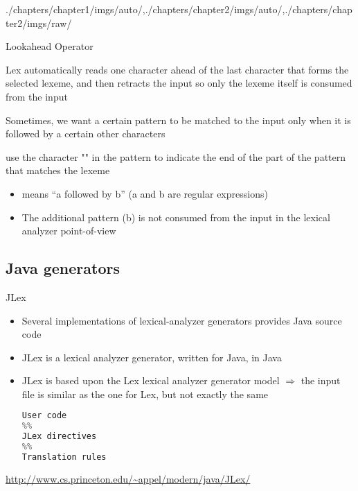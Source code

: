 \begin{graphicspathcontext}{{./chapters/chapter1/imgs/auto/},{./chapters/chapter2/imgs/auto/},{./chapters/chapter2/imgs/raw/}}
\begin{bibunit}[apalike]
\begin{frame}[background=8]{Lookahead Operator}
	\begin{description}
	\item Lex automatically reads one character ahead of the last character that forms the selected lexeme, and then retracts the input so only the lexeme itself is consumed from the input
	\vfill
	\item[Problem] Sometimes, we want a certain pattern to be matched to the input only when it is followed by a certain other characters
	\vfill
	\item[Solution] use the character "\code{/}" in the pattern to indicate the end of the part of the pattern that matches the lexeme
		\begin{itemize}
		\item {} means ``a followed by b'' (a and b are regular expressions) 
		\item The additional pattern (b) is not consumed from the input in the lexical analyzer point-of-view
		\end{itemize}
	\end{description}
\end{frame}

\subsection{Java generators}
\subsectiontableofcontentslide

\begin{frame}[fragile,background=6]{JLex}
	\begin{itemize}
	\item Several implementations of lexical-analyzer generators provides Java source code
	\vfill
	\item JLex is a lexical analyzer generator, written for Java, in Java
	\item JLex is based upon the Lex lexical analyzer generator model $\Rightarrow$ \alert{the input file is similar as the one for Lex, but not exactly the same}
		\begin{lstlisting}[language=Python]
User code
%%
JLex directives
%%
Translation rules
		\end{lstlisting}
	\end{itemize}
	\vfill
	\begin{center}
	\url{http://www.cs.princeton.edu/~appel/modern/java/JLex/}
	\end{center}
\end{frame}


\end{bibunit}
\end{graphicspathcontext}
